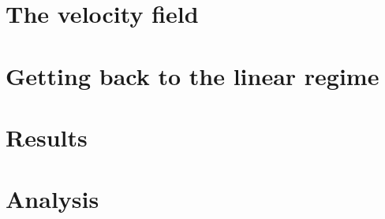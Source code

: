 \Huge

\section{The velocity field}

\section{Getting back to the linear regime}

\section{Results}

\section{Analysis}

